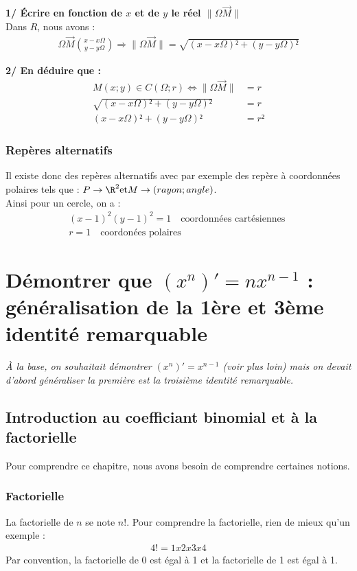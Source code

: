 \documentclass{report}
\begin{document}
\textbf{1/ Écrire en fonction de $x$ et de $y$ le réel $\| \Omega \vec M \|$} \\
Dans $R$, nous avons : 
\begin{align}
    \Omega \vec M \binom{x - x\Omega}{y - y\Omega} \Rightarrow \|\Omega \vec M \| = \sqrt {(x - x\Omega)² + (y-y\Omega)²}
\end{align}

\textbf{2/ En déduire que :} \\
\begin{align}
    M(x;y) \in C(\Omega;r) \Leftrightarrow \|\Omega \vec M\| &= r \\ \sqrt {(x-x\Omega)² + (y-y\Omega)²} &= r \\  (x-x\Omega)² + (y-y\Omega)² &= r² 
\end{align}


\subsection{Repères alternatifs}
Il existe donc des repères alternatifs avec par exemple des repère à coordonnées polaires tels que : $P \rightarrow \R^2 \text{et} M \rightarrow (rayon;angle)$. \\
Ainsi pour un cercle, on a  : 
\begin{gather}
    (x-1)^2 (y-1)^2 = 1 \quad \text{coordonnées cartésiennes } \\ r=1 \quad \text{coordonées polaires}
\end{gather}


\chapter{Démontrer que $(x^n)' = nx^{n-1}$ : généralisation de la 1ère et 3ème identité remarquable}

\emph{À la base, on souhaitait démontrer $(x^n)' = x^{n-1}$ (voir plus loin) mais on devait d’abord généraliser la première est la troisième identité remarquable.}

\section{Introduction au coefficiant binomial et à la factorielle}

Pour comprendre ce chapitre, nous avons besoin de comprendre certaines notions. 

\subsection{Factorielle}
La factorielle de $n$ se note $n!$. Pour comprendre la factorielle, rien de mieux qu'un exemple : 
\begin{gather}
    4! = 1x2x3x4
\end{gather}
Par convention, la factorielle de 0 est égal à 1 et la factorielle de 1 est égal à 1. 
\end{document}
